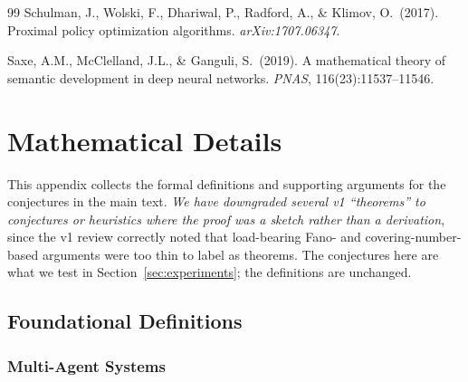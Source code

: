 \documentclass[10pt, letterpaper]{article}
\begin{document}
\begin{thebibliography}{99}
 Schulman, J., Wolski, F., Dhariwal, P., Radford, A., \& Klimov, O.\ (2017). Proximal policy optimization algorithms. \emph{arXiv:1707.06347}.

 Saxe, A.M., McClelland, J.L., \& Ganguli, S.\ (2019). A mathematical theory of semantic development in deep neural networks. \emph{PNAS}, 116(23):11537--11546.

\end{thebibliography}

\appendix

\section{Mathematical Details}
\label{app:math}

This appendix collects the formal definitions and supporting arguments for the conjectures in the main text. \emph{We have downgraded several v1 ``theorems'' to conjectures or heuristics where the proof was a sketch rather than a derivation}, since the v1 review correctly noted that load-bearing Fano- and covering-number-based arguments were too thin to label as theorems. The conjectures here are what we test in Section~\ref{sec:experiments}; the definitions are unchanged.

\subsection{Foundational Definitions}

\subsubsection{Multi-Agent Systems}
\end{document}
